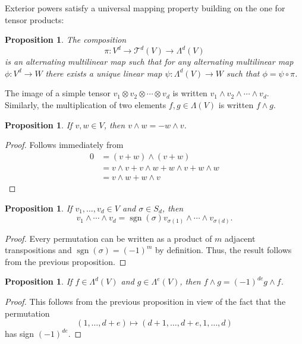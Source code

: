 \documentclass[12pt]{article}
\theoremstyle{plain}
\newtheorem{proposition}[theorem]{Proposition}
\theoremstyle{definition}
\theoremstyle{remark}
\numberwithin{equation}{section}
\begin{document}
Exterior powers satisfy a universal mapping property building on the
one for tensor products:

\begin{proposition}
The composition
\[
\pi : V^d \to \mathcal{T}^d(V) \to \Lambda^d(V)
\]
is an alternating multilinear map such that for any
alternating multilinear map
$\phi : V^d \to W$ there exists a unique linear map
$\psi : \Lambda^d(V) \to W$
such that
$\phi = \psi \circ \pi$.
\end{proposition}

The image of a simple tensor $v_1 \otimes v_2 \otimes \cdots \otimes v_d$
is written $v_1 \wedge v_2 \wedge \cdots \wedge v_d$.
Similarly, the multiplication of two elements $f,g \in \Lambda(V)$
is written $f \wedge g$.

\begin{proposition}
If $v,w \in V$, then $v \wedge w = -w \wedge v$.
\end{proposition}

\begin{proof}
Follows immediately from
\begin{align*}
0 &= (v+w) \wedge (v+w)\\
&=v \wedge v + v \wedge w + w \wedge v + w \wedge w\\
&=v \wedge w + w \wedge v
\end{align*}
\end{proof}

\begin{proposition}
If $v_1,\ldots,v_d \in V$ and $\sigma \in S_d$,
then
\[v_1 \wedge \cdots \wedge v_d =
\operatorname{sgn}(\sigma)
v_{\sigma(1)} \wedge \cdots \wedge v_{\sigma(d)}.
\]
\end{proposition}

\begin{proof}
Every permutation can be written as a product of $m$ adjacent
transpositions and $\operatorname{sgn}(\sigma)=(-1)^m$ by definition.
Thus, the result follows from the previous proposition.
\end{proof}

\begin{proposition}
If $f \in \Lambda^d(V)$ and $g \in \Lambda^e(V)$,
then $f \wedge g = (-1)^{de} g \wedge f$.
\end{proposition}

\begin{proof}
This follows from the previous proposition in view of the fact that
the permutation
\[
(1,\ldots,d+e) \mapsto (d+1,\ldots,d+e,1,\ldots,d)
\]
has sign $(-1)^{de}$.
\end{proof}
\end{document}
